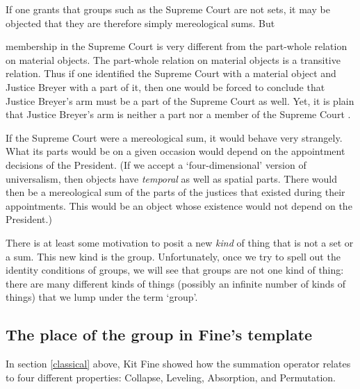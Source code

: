 \documentclass[11pt]{article}
\newenvironment{squote}{%
\begin{spacing}{1}
\begin{list}{}{%
\setlength{\labelwidth}{0pt}%
\rightmargin\leftmargin%
}
\item\relax
}{%
\end{list}%
\end{spacing}
}
\begin{document}
\begin{spacing}{1.5}
If one grants that groups such as the Supreme Court are not sets, it
may be objected that they are therefore simply mereological sums.  But

\begin{squote}
membership in the Supreme Court is very different from
the part-whole relation on material objects.  The part-whole relation
on material objects is a transitive relation.  Thus if one identified
the Supreme Court with a material object and Justice Breyer with a
part of it, then one would be forced to conclude that Justice Breyer's
arm must be a part of the Supreme Court as well.  Yet, it is plain
that Justice Breyer's arm is neither a part nor a member of the
Supreme Court \citep[136--137]{uzquiano2004a}.
\end{squote}

If the Supreme Court were a mereological sum, it would behave very
strangely.  What its parts would be on a given occasion would depend
on the appointment decisions of the President.  (If we accept a
`four-dimensional' version of universalism, then objects have {\em
  temporal} as well as spatial parts.  There would then be a
mereological sum of the parts of the justices that existed during
their appointments.  This would be an object whose existence would not
depend on the President.)

There is at least some motivation to posit a new {\em kind} of thing
that is not a set or a sum.  This new kind is the group.
Unfortunately, once we try to spell out the identity conditions of
groups, we will see that groups are not one kind of thing: there are
many different kinds of things (possibly an infinite number of kinds
of things) that we lump under the term `group'.  


\subsection{The place of the group in Fine's template}
\label{group-temp}
In section \ref{classical} above, Kit Fine showed how the summation
operator relates to four different properties: Collapse, Leveling,
Absorption, and Permutation.


\end{spacing}
\end{document}
